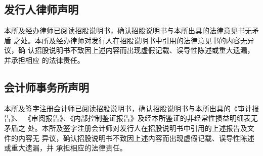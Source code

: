 


\clearpage
\subsection{发行人律师声明}

本所及经办律师已阅读招股说明书，确认招股说明书与本所出具的法律意见书无矛盾
之处。本所及经办律师对发行人在招股说明书中引用的法律意见书的内容无异议，确
认招股说明书不致因上述内容而出现虚假记载、误导性陈述或重大遗漏，并承担相应
的法律责任。




\clearpage
\subsection{会计师事务所声明}

本所及签字注册会计师已阅读招股说明书，确认招股说明书与本所出具的《审计报告》、
《审阅报告》、《内部控制鉴证报告》及经本所鉴证的非经常性损益明细表无矛盾之
处。本所及签字注册会计师对发行人在招股说明书中引用的上述报告及文件的内容无
异议，确认招股说明书不致因上述内容而出现虚假记载、误导性陈述或重大遗漏，并
承担相应的法律责任。




%
%
%
%
